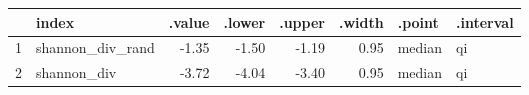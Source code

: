 \begin{table}[ht]
\centering
\begin{tabular}{rlrrrrll}
  \hline
 & index & .value & .lower & .upper & .width & .point & .interval \\ 
  \hline
1 & shannon\_div\_rand & -1.35 & -1.50 & -1.19 & 0.95 & median & qi \\ 
  2 & shannon\_div & -3.72 & -4.04 & -3.40 & 0.95 & median & qi \\ 
   \hline
\end{tabular}
\end{table}

